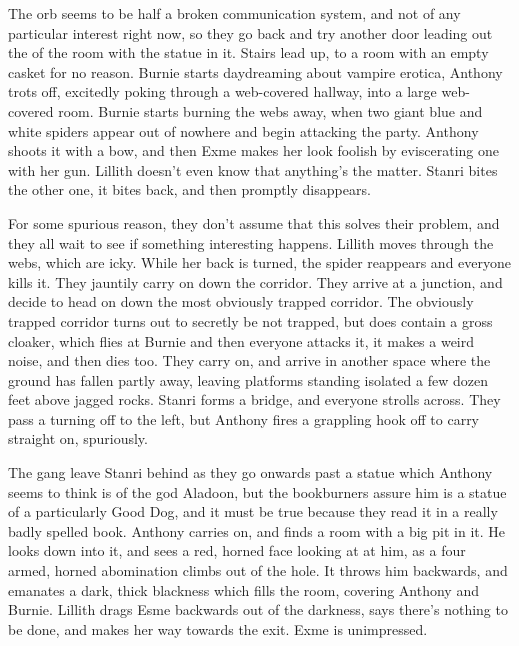\begin{multicols}{2}
The orb seems to be half a broken communication system, and not of any particular interest right now, so they go back and try another door leading out the of the room with the statue in it. Stairs lead up, to a room with an empty casket for no reason. Burnie starts daydreaming about vampire erotica, Anthony trots off, excitedly poking through a web-covered hallway, into a large web-covered room. Burnie starts burning the webs away, when two giant blue and white spiders appear out of nowhere and begin attacking the party. Anthony shoots it with a bow, and then Exme makes her look foolish by eviscerating one with her gun. Lillith doesn’t even know that anything’s the matter. Stanri bites the other one, it bites back, and then promptly disappears.\medskip

For some spurious reason, they don’t assume that this solves their problem, and they all wait to see if something interesting happens. Lillith moves through the webs, which are icky. While her back is turned, the spider reappears and everyone kills it. They jauntily carry on down the corridor. They arrive at a junction, and decide to head on down the most obviously trapped corridor. The obviously trapped corridor turns out to secretly be not trapped, but does contain a gross cloaker, which flies at Burnie and then everyone attacks it, it makes a weird noise, and then dies too. They carry on, and arrive in another space where the ground has fallen partly away, leaving platforms standing isolated a few dozen feet above jagged rocks. Stanri forms a bridge, and everyone strolls across. They pass a turning off to the left, but Anthony fires a grappling hook off to carry straight on, spuriously.\medskip

The gang leave Stanri behind as they go onwards past a statue which Anthony seems to think is of the god Aladoon, but the bookburners assure him is a statue of a particularly Good Dog, and it must be true because they read it in a really badly spelled book. Anthony carries on, and finds a room with a big pit in it. He looks down into it, and sees a red, horned face looking at at him, as a four armed, horned abomination climbs out of the hole. It throws him backwards, and emanates a dark, thick blackness which fills the room, covering Anthony and Burnie. Lillith drags Esme backwards out of the darkness, says there’s nothing to be done, and makes her way towards the exit. Exme is unimpressed.\medskip


\end{multicols}
